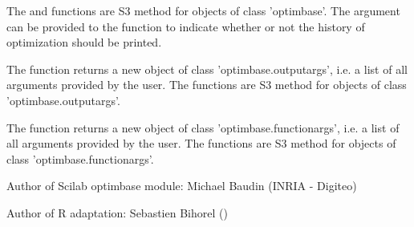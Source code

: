 \begin{Value}
\begin{description}
\end{description}


The  and  functions are S3 method for 
objects of class 'optimbase'. The  argument can be provided 
to the  function to indicate whether or not the history 
of optimization should be printed.

The  function returns a new object of class
'optimbase.outputargs', i.e. a list of all arguments provided by the user. The 
 functions are S3 method for objects of class 
'optimbase.outputargs'.

The  function returns a new object of class
'optimbase.functionargs', i.e. a list of all arguments provided by the user.
The  functions are S3 method for objects of 
class 'optimbase.functionargs'.
\end{Value}
%
\begin{Author}\relax
Author of Scilab optimbase module: Michael Baudin (INRIA - Digiteo)

Author of R adaptation: Sebastien Bihorel ()
\end{Author}
